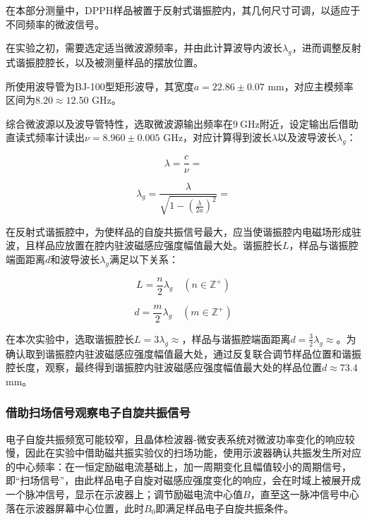 \documentclass{thuemp}
\begin{document}
在本部分测量中，DPPH样品被置于反射式谐振腔内，其几何尺寸可调，以适应于不同频率的微波信号。

在实验之初，需要选定适当微波源频率，并由此计算波导内波长$\lambda_g$，进而调整反射式谐振腔腔长，以及被测量样品的摆放位置。

所使用波导管为BJ-100型矩形波导，其宽度$a=22.86\pm0.07$ \si{\milli\meter}，对应主模频率区间为$8.20 \approx 12.50$ \si{\giga\hertz}。

综合微波源以及波导管特性，选取微波源输出频率在$9~\text{GHz}$附近，设定输出后借助直读式频率计读出$\nu  = 8.960 \pm 0.005$ \si{\giga\hertz}，对应计算得到波长$\lambda$以及波导波长$\lambda_g$：

\begin{equation}
\lambda = \frac{c}{\nu} = 
\end{equation}

\begin{equation}
\lambda_g = \frac{\lambda}{\sqrt{1 - \left(\frac{\lambda}{2a}\right)^2}} = 
\end{equation}

在反射式谐振腔中，为使样品的自旋共振信号最大，应当使谐振腔内电磁场形成驻波，且样品应放置在腔内驻波磁感应强度幅值最大处。谐振腔长$L$，样品与谐振腔端面距离$d$和波导波长$\lambda_g$满足以下关系：

\begin{equation}
L = \frac{n}{2}\lambda_g \quad (n \in \mathbb{Z}^+)
\end{equation}

\begin{equation}
d = \frac{m}{2}\lambda_g \quad (m \in \mathbb{Z}^+)
\end{equation}

在本次实验中，选取谐振腔长$L=3\lambda_g\approx$，样品与谐振腔端面距离$d=\frac{3}{2}\lambda_g\approx$。为确认取到谐振腔内驻波磁感应强度幅值最大处，通过反复联合调节样品位置和谐振腔长度，观察，最终得到谐振腔内驻波磁感应强度幅值最大处的样品位置$d \approx 73.4 $\si{\milli\meter}。

\subsubsection{借助扫场信号观察电子自旋共振信号}

电子自旋共振频宽可能较窄，且晶体检波器-微安表系统对微波功率变化的响应较慢，因此在实验中借助磁共振实验仪的扫场功能，使用示波器确认共振发生所对应的中心频率：在一恒定励磁电流基础上，加一周期变化且幅值较小的周期信号，即“扫场信号”，由此样品电子自旋对磁感应强度变化的响应，会在时域上被展开成一个脉冲信号，显示在示波器上；调节励磁电流中心值$B$，直至这一脉冲信号中心落在示波器屏幕中心位置，此时$B_0$即满足样品电子自旋共振条件。
\end{document}
